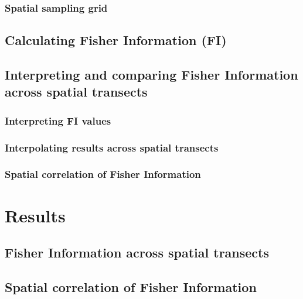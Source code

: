 \documentclass[12pt,twoside,openany]{reedthesis}
\begin{document}
\subsubsection{Spatial sampling grid}\label{spatial-sampling-grid}

\subsection{Calculating Fisher Information
(FI)}\label{calculating-fisher-information-fi}

\subsection{Interpreting and comparing Fisher Information across spatial
transects}\label{interpreting-and-comparing-fisher-information-across-spatial-transects}

\subsubsection{Interpreting FI values}\label{interpreting-fi-values}

\subsubsection{Interpolating results across spatial
transects}\label{interpolating-results-across-spatial-transects}

\subsubsection{Spatial correlation of Fisher
Information}\label{spatial-correlation-of-fisher-information}

\section{Results}\label{results-1}

\subsection{Fisher Information across spatial
transects}\label{fisher-information-across-spatial-transects}

\subsection{Spatial correlation of Fisher
Information}\label{spatial-correlation-of-fisher-information-1}
\end{document}
